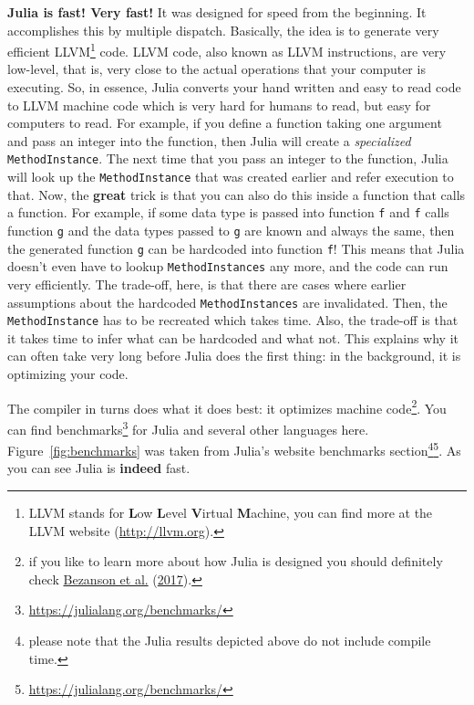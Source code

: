 \documentclass[
  notoc %
]{tufte-book}
\DeclareRobustCommand{\href}[2]{#2\footnote{\url{#1}}}
\newcommand{\passthrough}[1]{#1}
\begin{document}
\textbf{Julia is fast! Very fast!} It was designed for speed from the
beginning. It accomplishes this by multiple dispatch. Basically, the
idea is to generate very efficient LLVM\footnote{LLVM stands for
  \textbf{L}ow \textbf{L}evel \textbf{V}irtual \textbf{M}achine, you can
  find more at the LLVM website (\url{http://llvm.org}).} code. LLVM
code, also known as LLVM instructions, are very low-level, that is, very
close to the actual operations that your computer is executing. So, in
essence, Julia converts your hand written and easy to read code to LLVM
machine code which is very hard for humans to read, but easy for
computers to read. For example, if you define a function taking one
argument and pass an integer into the function, then Julia will create a
\emph{specialized} \passthrough{\lstinline!MethodInstance!}. The next
time that you pass an integer to the function, Julia will look up the
\passthrough{\lstinline!MethodInstance!} that was created earlier and
refer execution to that. Now, the \textbf{great} trick is that you can
also do this inside a function that calls a function. For example, if
some data type is passed into function \passthrough{\lstinline!f!} and
\passthrough{\lstinline!f!} calls function \passthrough{\lstinline!g!}
and the data types passed to \passthrough{\lstinline!g!} are known and
always the same, then the generated function \passthrough{\lstinline!g!}
can be hardcoded into function \passthrough{\lstinline!f!}! This means
that Julia doesn't even have to lookup
\passthrough{\lstinline!MethodInstances!} any more, and the code can run
very efficiently. The trade-off, here, is that there are cases where
earlier assumptions about the hardcoded
\passthrough{\lstinline!MethodInstances!} are invalidated. Then, the
\passthrough{\lstinline!MethodInstance!} has to be recreated which takes
time. Also, the trade-off is that it takes time to infer what can be
hardcoded and what not. This explains why it can often take very long
before Julia does the first thing: in the background, it is optimizing
your code.

The compiler in turns does what it does best: it optimizes machine
code\footnote{if you like to learn more about how Julia is designed you
  should definitely check
  \protect\hyperlink{ref-bezanson2017julia}{Bezanson et al.}
  (\protect\hyperlink{ref-bezanson2017julia}{2017}).}. You can find
\href{https://julialang.org/benchmarks/}{benchmarks} for Julia and
several other languages here. Figure~\ref{fig:benchmarks} was taken from
\href{https://julialang.org/benchmarks/}{Julia's website benchmarks
section\footnote{please note that the Julia results depicted above do
  not include compile time.}}. As you can see Julia is \textbf{indeed}
fast.
\end{document}
